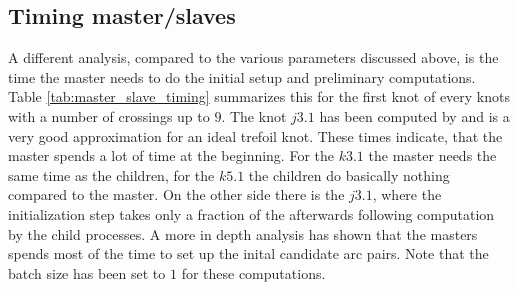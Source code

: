 \documentclass{article}
\begin{document}
\begin{comment}
\begin{figure}
\texttt{[image: time\_vs\_cpus.pdf]}
\caption{XXX Explain \label{fig:time_vs_cpus}}
\end{figure}

\begin{figure}
\texttt{[image: time\_vs\_nodes.pdf]}
\caption{XXX Explain \label{fig:time_vs_nodes}}
\end{figure}

\begin{figure}
\texttt{[image: time\_vs\_knots.pdf]}
\caption{XXX Explain \label{fig:time_vs_knots}}
\end{figure}

\begin{figure}
\texttt{[image: time\_vs\_batch.pdf]}
\caption{XXX Explain \label{fig:time_vs_batch}}
\end{figure}
\end{comment}

\subsection{Timing master/slaves}


A different analysis, compared to the various parameters discussed above, is
the time the master needs to do the initial setup and preliminary computations.
Table \ref{tab:master_slave_timing} summarizes this for the first knot of every knots
with a number of crossings up to $9$. The knot $j3.1$ has been computed by \cite{XXX}
and is a very good approximation for an ideal trefoil knot. These times indicate,
that the master spends a lot of time at the beginning. For the $k3.1$ the master
needs the same time as the children, for the $k5.1$ the children do basically
nothing compared to the master. On the other side there is the $j3.1$, where
the initialization step takes only a fraction of the afterwards following
computation by the child processes. A more in depth analysis has shown that
the masters spends most of the time to set up the inital candidate arc pairs.
Note that the batch size has been set to $1$ for these computations.
\end{document}
